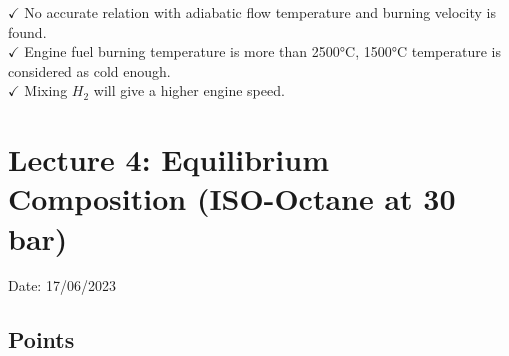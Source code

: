 \documentclass{article}
\begin{document}
$\checkmark$ No accurate relation with adiabatic flow temperature and burning velocity is found. \\
$\checkmark$ Engine fuel burning temperature is more than 2500°C, 1500°C temperature is considered as cold enough. \\
$\checkmark$ Mixing $H_2$ will give a higher engine speed. \\
\vspace*{2cm}

\section{Lecture 4: Equilibrium Composition (ISO-Octane at 30 bar)}
\hfill Date: 17/06/2023
\subsection*{Points}
\end{document}
